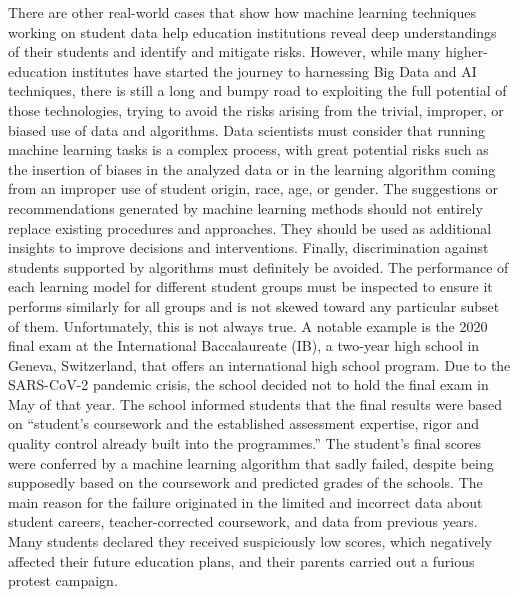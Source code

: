 There are other real-world cases that show how machine learning techniques working on student data help education institutions reveal deep understandings of their students and identify and mitigate risks. However, while many higher-education institutes have started the journey to harnessing Big Data and AI techniques, there is still a long and bumpy road to exploiting the full potential of those technologies, trying to avoid the risks arising from the trivial, improper, or biased use of data and algorithms. Data scientists must consider that running machine learning tasks is a complex process, with great potential risks such as the insertion of biases in the analyzed data or in the learning algorithm coming from an improper use of student origin, race, age, or gender. The suggestions or recommendations generated by machine learning methods should not entirely replace existing procedures and approaches. They should be used as additional insights to improve decisions and interventions. Finally, discrimination against students supported by algorithms must definitely be avoided. The performance of each learning model for different student groups must be inspected to ensure it performs similarly for all groups and is not skewed toward any particular subset of them. Unfortunately, this is not always true. A notable example is the 2020 final exam at the International Baccalaureate (IB), a two-year high school in Geneva, Switzerland, that offers an international high school program. Due to the SARS-CoV-2 pandemic crisis, the school decided not to hold the final exam in May of that year. The school informed students that the final results were based on ``student's coursework and the established assessment expertise, rigor and quality control already built into the programmes.'' The student's final scores were conferred by a machine learning algorithm that sadly failed, despite being supposedly based on the coursework and predicted grades of the schools. The main reason for the failure originated in the limited and incorrect data about student careers, teacher-corrected coursework, and data from previous years. Many students declared they received suspiciously low scores, which negatively affected their future education plans, and their parents carried out a furious protest campaign.

